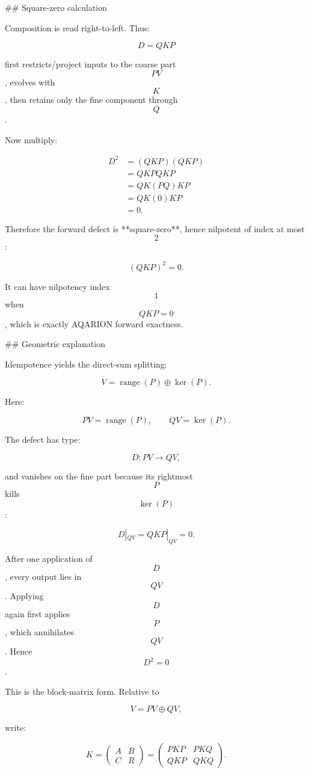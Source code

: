 ## Square-zero calculation

Composition is read right-to-left. Thus:

$$
D=QKP
$$

first restricts/project inputs to the coarse part $$PV$$, evolves with $$K$$, then retains only the fine component through $$Q$$.

Now multiply:

$$
\begin{aligned}
D^2
&=(QKP)(QKP)\\
&=QKPQKP\\
&=QK(PQ)KP\\
&=QK(0)KP\\
&=0.
\end{aligned}
$$

Therefore the forward defect is **square-zero**, hence nilpotent of index at most $$2$$:

$$
\boxed{(QKP)^2=0.}
$$

It can have nilpotency index $$1$$ when $$QKP=0$$, which is exactly AQARION forward exactness.

## Geometric explanation

Idempotence yields the direct-sum splitting:

$$
V=\operatorname{range}(P)\oplus\ker(P).
$$

Here:

$$
PV=\operatorname{range}(P),
\qquad
QV=\ker(P).
$$

The defect has type:

$$
D:PV\longrightarrow QV,
$$

and vanishes on the fine part because its rightmost $$P$$ kills $$\ker(P)$$:

$$
D|_{QV}=QKP|_{QV}=0.
$$

After one application of $$D$$, every output lies in $$QV$$. Applying $$D$$ again first applies $$P$$, which annihilates $$QV$$. Hence $$D^2=0$$.

This is the block-matrix form. Relative to

$$
V=PV\oplus QV,
$$

write:

$$
K=
\begin{pmatrix}
A & B\\
C & R
\end{pmatrix}
=
\begin{pmatrix}
PKP & PKQ\\
QKP & QKQ
\end{pmatrix}.
$$

